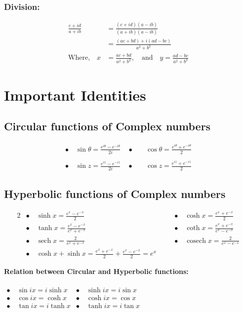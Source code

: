  \subsubsection{Division:}\begin{align*}
 \frac{c+i d}{a+i b}&=\frac{(c+i d)(a-i b)}{(a+i b)(a-i b)}\\&=\frac{(a c+b d)+i(a d-b c)}{a^{2}+b^{2}}\\
 \text{Where,}\quad x&=\frac{a c+b d}{a^{2}+b^{2}},\quad \text{and} \quad y=\frac{a d-b c}{a^{2}+b^{2}}
 \end{align*}
 
\section{Important Identities}
\subsection{Circular functions of Complex numbers}

\begin{align*}
	\bullet\quad\sin \theta=\frac{e^{i \theta}-e^{-i \theta}}{2 i}\quad\bullet&\quad\cos \theta=\frac{e^{i \theta}+e^{-i \theta}}{2}\\\\
\bullet\quad\sin z=\frac{e^{i z}-e^{-i z}}{2 i}\quad\bullet&\quad\cos z=\frac{e^{i z}+e^{-i z}}{2}
\end{align*}

\subsection{Hyperbolic functions of Complex numbers}
\begin{alignat*}{2}
&\bullet\quad \sinh x=\frac{e^{x}-e^{-x}}{2}\quad&&\bullet\quad \cosh x=\frac{e^{x}+e^{-x}}{2}\\
&\bullet\quad\tanh x=\frac{e^{x}-e^{-x}}{e^{x}+e^{-x}}\quad&&\bullet \quad {\coth} x=\frac{e^{x}+e^{-x}}{e^{x}-e^{-x}}
\\
&\bullet\quad{\operatorname{sech}} x=\frac{2}{e^{x}+e^{-x}} \quad&&\bullet \quad {\operatorname{cosech}} x=\frac{2}{e^{x}-e^{-x}}\\
&\bullet\quad\cosh x+\sinh x=\frac{e^{x}+e^{-x}}{2}+\frac{e^{x}-e^{-x}}{2}=e^{x} \quad&& \quad
\end{alignat*}
\begin{note}
\textbf{\textbf{Relation between Circular and Hyperbolic functions:}}\\\\
$\begin{array}{ll}\bullet\quad\sin i x=i \sinh x & \bullet\quad \sinh i x=i \sin x \\ \bullet\quad\cos i x=\cosh x & \bullet\quad \cosh i x=\cos x \\ \bullet\quad\tan i x=i \tanh x& \bullet\quad \tanh i x=i \tan x\end{array}$

\end{note}


